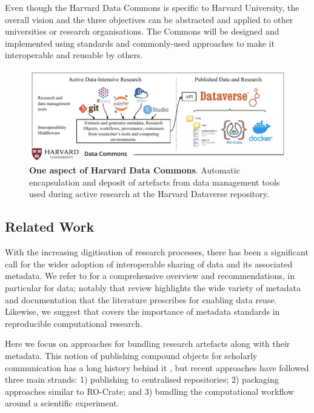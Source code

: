 Even though the Harvard Data Commons is specific to Harvard University,
the overall vision and the three objectives can be abstracted and
applied to other universities or research organisations. The Commons
will be designed and implemented using standards and commonly-used
approaches to make it interoperable and reusable by others.

\begin{figure}%
  \includegraphics[width=1.1\textwidth]{figures/ch05/data-commons-ro-crate-figure-5.pdf}
  \caption{\textbf{One aspect of Harvard Data Commons}. Automatic
  encapsulation and deposit of artefacts from data management tools used
  during active research at the Harvard Dataverse repository.}
  \label{ch5:fig:hdc}
\end{figure}

\subsection{Related Work}\label{ch5:relatedwork}

With the increasing digitisation of research processes, there has been a
significant call for the wider adoption of interoperable sharing of data
and its associated metadata. We refer to
\cite{ch5-72} for a
comprehensive overview and recommendations, in particular for data;
notably that review highlights the wide variety of metadata and
documentation that the literature prescribes for enabling data reuse.
Likewise, we suggest
\cite{Leipzig 2021} that
covers the importance of metadata standards in reproducible
computational research.

Here we focus on approaches for bundling research artefacts along with
their metadata. This notion of publishing compound objects for scholarly
communication has a long history behind it
\cite{Claerbout 1992}
\cite{ch5-117},
but recent approaches have followed three main strands: 1) publishing to
centralised repositories; 2) packaging approaches similar to RO-Crate;
and 3) bundling the computational workflow around a scientific
experiment.

